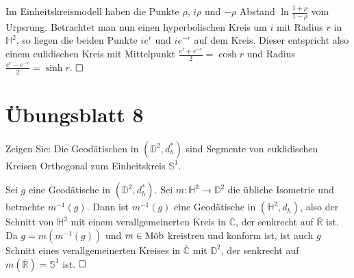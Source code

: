 \documentclass[11pt]{book}
\numberwithin{dummy}{section}
\theoremstyle{nonumberbreak}
\newenvironment{prob}[1][]{\ifthenelse{\equal{#1}{}}{\problem}{\problem[#1]}\rm}{\endproblem}
\newenvironment{sol}[1][]{\ifthenelse{\equal{#1}{}}{\solution}{\solution[#1]}\rm}{\endsolution}
\newcommand{\Sph}{\mathbb{S}}
\newcommand{\He}{\mathbb{H}}
\newcommand{\RR}{\overline{\mathbb{R}}}
\newcommand{\CC}{\overline{\mathbb{C}}}
\newcommand{\D}{\mathbb{D}}
\newcommand{\la}{\longrightarrow}
\newcommand{\amob}{\textup{Möb}}
\begin{document}
\begin{spacing}{1.4}
\begin{prob}
\begin{sol}
\begin{compactenum}
\item Im Einheitskreismodell haben die Punkte $\rho$, $i\rho$ und $-\rho$ Abstand $\ln \frac{1+\rho}{1-\rho}$ vom Urpsrung. Betrachtet man nun einen hyperbolischen Kreis um $i$ mit Radius $r$ in $\He^2$, so liegen die beiden Punkte $ie^r$ und $ie^{-r}$ auf dem Kreis. Dieser entspricht also einem eulidischen Kreis mit Mittelpunkt $\frac{e^r+e^{-r}}{2}=\cosh r$ und Radius $\frac{e^r-e^{-r}}{2}=\sinh r$. $\hfill \Box$


\end{compactenum}
\end{sol}


\end{prob}



















\newpage




\titlespacing*{\section}{-16.5pt}{0pt}{20pt}
\renewcommand*\thesection{}
\section{Übungsblatt 8} %
\renewcommand*\thesection{\arabic{section}}




\begin{prob}   %
Zeigen Sie: Die Geodätischen in $(\D^2, d_h^*)$ sind Segmente von euklidischen Kreisen Orthogonal zum Einheitskreis $\Sph^1$.

\begin{sol}
Sei $g$ eine Geodätische in $(\D^2, d_h^*)$. Sei $m: \He^2 \la \D^2$ die übliche Isometrie und betrachte $m^{-1}(g)$. Dann ist $m^{-1}(g)$ eine Geodätische in $(\He^2, d_h)$, also der Schnitt von $\He^2$ mit einem verallgemeinerten Kreis in $\CC$, der senkrecht auf $\RR$ ist. Da $g=m(m^{-1}(g))$ und $m\in \amob$ kreistreu und konform ist, ist auch $g$ Schnitt eines verallgemeinerten Kreises in $\CC$ mit $\D^2$, der senkrecht auf $m(\RR) = \Sph^1$ ist. $\hfill \Box$

\end{sol}



\end{prob}
\end{spacing}
\end{document}
